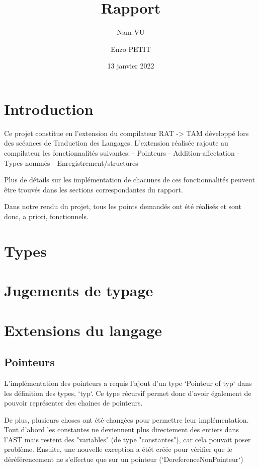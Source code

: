 \documentclass[headings=standardclasses,parskip=half]{scrartcl}
\title{Rapport}
\subtitle{}
\author{Nam VU \and Enzo PETIT}
\date{13 janvier 2022}
\begin{document}
\maketitle

\tableofcontents

\pagebreak

\section{Introduction}
Ce projet constitue en l'extension du compilateur RAT -> TAM développé lors des scéances de Traduction des Langages.
L'extension réalisée rajoute au compilateur les fonctionnalités suivantes:
    - Pointeurs
    - Addition-affectation
    - Types nommés
    - Enregistrement/structures

Plus de détails sur les implémentation de chacunes de ces fonctionnalités peuvent être trouvés dans les sections correspondantes du rapport.

Dans notre rendu du projet, tous les points demandés ont été réalisés et sont donc, a priori, fonctionnels.

\section{Types}

\section{Jugements de typage}

\section{Extensions du langage}

\subsection{Pointeurs}
L'implémentation des pointeurs a requis l'ajout d'un type `Pointeur of typ` dans les définition des types, `typ`.
Ce type récursif permet donc d'avoir également de pouvoir représenter des chaines de pointeurs.

De plus, plusieurs choses ont été changées pour permettre leur implémentation.
Tout d'abord les constantes ne deviennent plus directement des entiers dans l'AST mais restent des "variables" (de type "constantes"), car cela pouvait poser problème.
Ensuite, une nouvelle exception a étét créée pour vérifier que le déréférencement ne s'effectue que sur un pointeur (`DereferenceNonPointeur`)
\end{document}
